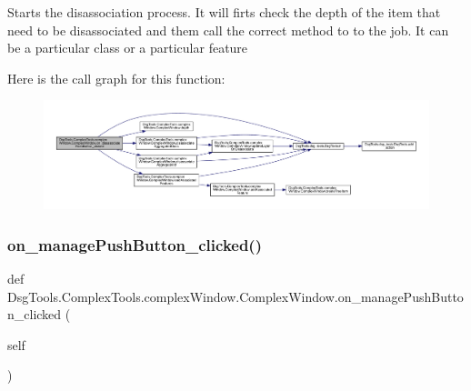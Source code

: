 \begin{DoxyVerb}Starts the disassociation process.
It will firts check the depth of the item that need to be disassociated and them call the correct method to to the job.
It can be a particular class or a particular feature
\end{DoxyVerb}
 Here is the call graph for this function\+:
\nopagebreak
\begin{figure}[H]
\begin{center}
\leavevmode
\includegraphics[width=350pt]{class_dsg_tools_1_1_complex_tools_1_1complex_window_1_1_complex_window_ad92dd4f252e46de62faa10df84639819_cgraph}
\end{center}
\end{figure}
\mbox{\label{class_dsg_tools_1_1_complex_tools_1_1complex_window_1_1_complex_window_acd28666ddddd5ff62cdf00531b484cf4}} 
\subsubsection{\texorpdfstring{on\+\_\+manage\+Push\+Button\+\_\+clicked()}{on\_managePushButton\_clicked()}}
{\footnotesize\ttfamily def Dsg\+Tools.\+Complex\+Tools.\+complex\+Window.\+Complex\+Window.\+on\+\_\+manage\+Push\+Button\+\_\+clicked (\begin{DoxyParamCaption}\item[{}]{self }\end{DoxyParamCaption})}

